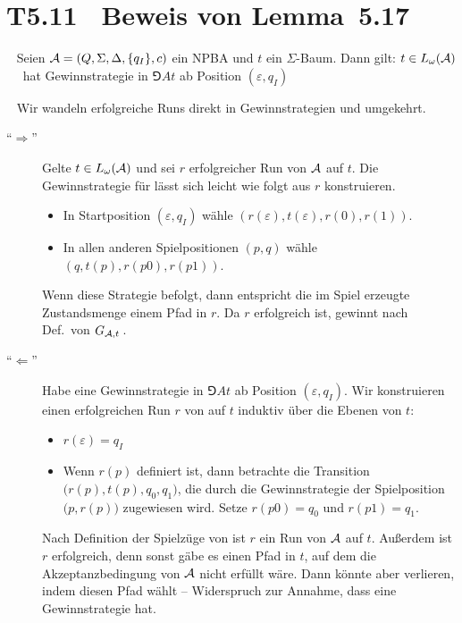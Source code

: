 \documentclass[fontsize=11pt, twoside=false, numbers=autoenddot]{scrbook}
\begin{document}
\pagebreak
\section*{T5.11~ Beweis von Lemma~5.17}

~
Seien $\mathcal{A} = (Q,\Sigma,\Delta,\{q_I\},c)$ ein NPBA und $t$ ein $\Sigma$-Baum.
Dann gilt:
$t \in L_\omega(\mathcal{A})$ ~~ \AUT hat Gewinnstrategie in $\Game{A}{t}$ ab Position $(\varepsilon,q_I)$

\par\medskip
{}~
Wir wandeln erfolgreiche Runs direkt in Gewinnstrategien
und umgekehrt.
%
\begin{description}
  \item[{\boldmath "`$\Rightarrow$"'}] 
    Gelte $t \in L_\omega(\mathcal{A})$ und sei $r$ erfolgreicher Run von $\mathcal{A}$ auf $t$.
    Die Gewinnstrategie für \AUT lässt sich leicht wie folgt aus $r$ konstruieren.
    \begin{itemize}
      \item
        In Startposition $(\varepsilon,q_I)$ wähle
        $(r(\varepsilon),t(\varepsilon),r(0),r(1))$.
      \item
        In allen anderen Spielpositionen $(p,q)$ wähle
        $(q,t(p),r(p0),r(p1))$.
    \end{itemize}
    Wenn \AUT diese Strategie befolgt,
    dann entspricht die im Spiel erzeugte Zustandsmenge
    einem Pfad in $r$.
    Da $r$ erfolgreich ist, gewinnt \AUT nach Def.\ von $G_{\mathcal{A},t}$\,.
    \parI
  \item[{\boldmath "`$\Leftarrow$"'}] 
    Habe \AUT eine Gewinnstrategie in $\Game{A}{t}$ ab Position $(\varepsilon,q_I)$.
    Wir konstruieren einen erfolgreichen Run $r$ von \Amc auf $t$
    induktiv über die Ebenen von $t$:
    \begin{itemize}
      \item
        $r(\varepsilon) = q_I$
      \item
        Wenn $r(p)$ definiert ist,
        dann betrachte die Transition $\big(r(p),t(p),q_0,q_1\big)$,
        die durch die Gewinnstrategie der Spielposition $\big(p,r(p)\big)$
        zugewiesen wird.
        Setze $r(p0) = q_0$ und $r(p1) = q_1$.
    \end{itemize}
    Nach Definition der Spielzüge von \AUT ist $r$ ein Run von $\mathcal{A}$ auf $t$.
    Außerdem ist $r$ erfolgreich,
    denn sonst gäbe es einen Pfad in $t$, auf dem die Akzeptanzbedingung von $\mathcal{A}$
    nicht erfüllt wäre. Dann könnte aber \AUT verlieren, indem \PF diesen Pfad wählt
    -- Widerspruch zur Annahme, dass \AUT eine Gewinnstrategie hat.
    \qedhere
\end{description}
\end{document}
